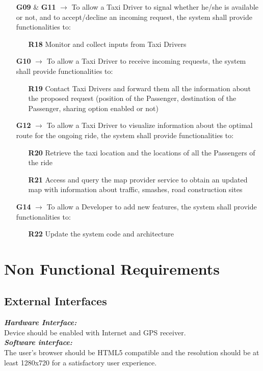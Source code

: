 \begin{itemize}
	\item [\textbf{G09}] \& \textbf{G11} $\rightarrow$ To allow a Taxi Driver to signal whether he/she is available or not, and to accept/decline an incoming request, the system shall provide functionalities to:
	\begin{itemize}
		\item [\textbf{R18}] Monitor and collect inputs from Taxi Drivers
	\end{itemize}
	
	\item [\textbf{G10}] $\rightarrow$ To allow a Taxi Driver to receive incoming requests, the system shall provide functionalities to:
	\begin{itemize}
		\item [\textbf{R19}] Contact Taxi Drivers and forward them all the information about the proposed request (position of the Passenger, destination of the Passenger, sharing option enabled or not)
	\end{itemize}		
	
	\item [\textbf{G12}] $\rightarrow$ To allow a Taxi Driver to visualize information about the optimal route for the ongoing ride, the system shall provide functionalities to:
	\begin{itemize}
		\item [\textbf{R20}] Retrieve the taxi location and the locations of all the Passengers of the ride
		\item [\textbf{R21}] Access and query the map provider service to obtain an updated map with information about traffic, smashes, road construction sites
	\end{itemize}
	
	\item [\textbf{G14}] $\rightarrow$ To allow a Developer to add new features, the system shall provide functionalities to:
	\begin{itemize}
		\item [\textbf{R22}] Update the system code and architecture
	\end{itemize}
\end{itemize}

\section{Non Functional Requirements}

\subsection{External Interfaces}
\textit{\textbf{Hardware Interface:}}\\
Device should be enabled with Internet and GPS receiver.\\
\textit{\textbf{Software interface:}}\\
The user's browser should be HTML5 compatible and the resolution should be at least 1280x720 for a satisfactory user experience.\\

